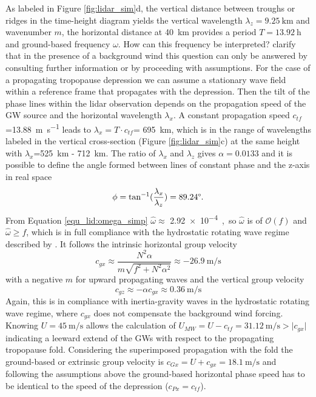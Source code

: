 As labeled in Figure \ref{fig:lidar_sim}d, the vertical distance between troughs or ridges in the time-height diagram yields the vertical wavelength $\lambda_z=\SI{9.25}{\kilo \meter}$ and wavenumber $m$, the horizontal distance at \SI{40}{\kilo \meter} provides a period $T=\SI{13.92}{\hour}$ and ground-based frequency $\omega$. How can this frequency be interpreted? \textcite[]{dornbrack_interpretation_2017} clarify that in the presence of a background wind this question can only be answered by consulting further information or by proceeding with assumptions. For the case of a propagating tropopause depression we can assume a stationary wave field within a reference frame that propagates with the depression. Then the tilt of the phase lines within the lidar observation depends on the propagation speed of the GW source and the horizontal wavelength $\lambda_x$. A constant propagation speed $c_{tf}$=\SI{13.88}{\meter \per \second} leads to $\lambda_x = T \cdot c_{tf}$= \SI{695}{\kilo \meter}, which is in the range of wavelengths labeled in the vertical cross-section (Figure \ref{fig:lidar_sim}c) at the same height with $\lambda_x$=\SI{525}{\kilo \meter} - \SI{712}{\kilo \meter}. The ratio of $\lambda_x$ and $\lambda_z$ gives $\alpha=0.0133$ and it is possible to define the angle formed between lines of constant phase and the z-axis in real space
\begin{equation}
    \phi = \tan^{-1}(\frac{\lambda_x}{\lambda_z})=89.24\degree.
    \label{equ_lid:phi}
\end{equation}
From Equation \ref{equ_lid:omega_simp} $\hat{\omega}\approx$ \SI{2.92e-4}, so $\hat{\omega}$ is of $\mathcal{O}(f)$ and $\hat{\omega} \geq f$, which is in full compliance with the hydrostatic rotating wave regime described by \textcite[]{gill_atmosphere-ocean_1982}. It follows the intrinsic horizontal group velocity
\begin{equation}
    c_{gx} \approx \frac{N^2 \alpha}{m \sqrt{f^2+N^2 \alpha^2}} \approx \SI{-26.9}{\meter\per\second} 
    \label{equ_lid:cgh}
\end{equation}
with a negative $m$ for upward propagating waves and the vertical group velocity
\begin{equation}
    c_{gz} \approx -\alpha c_{gx} \approx \SI{0.36}{\meter\per\second}
    \label{equ_lid:cgz}
\end{equation}
Again, this is in compliance with inertia-gravity waves in the hydrostatic rotating wave regime, where $c_{gx}$ does not compensate the background wind forcing. Knowing $U=\SI{45}{\meter\per\second}$ allows the calculation of $U_{MW}=U-c_{tf}=\SI{31.12}{\meter\per\second}>\lvert c_{gx} \rvert$ indicating a leeward extend of the GWs with respect to the propagating tropopause fold. Considering the superimposed propagation with the fold the ground-based or extrinsic group velocity is $c_{Gx}=U+c_{gx}=\SI{18.1}{\meter\per\second}$ and following the assumptions above the ground-based horizontal phase speed has to be identical to the speed of the depression ($c_{Px} = c_{tf}$). \\
